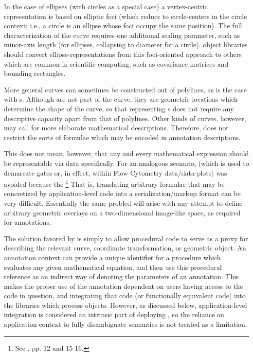 {\begin{description}
In the case of ellipses (with circles as a special case) 
a vertex-centric representation is based on elliptic 
foci (which reduce to circle-centers in the circle 
context; i.e., a circle is an ellipse whose foci occupy 
the same position).  The full characterization of 
the curve requires one additional scaling parameter, 
such as minor-axis length (for ellipses, collapsing 
to diameter for a circle).  \lAXFI{} object libraries  
should convert ellipse-representations from 
this foci-oriented approach to others which are 
common in scientific computing, such as covariance matrices 
and bounding rectangles.  

More general curves can sometimes be constructed out 
of polylines, as is the case with 
\BSPLINE{}s.  Although \BSPLINE{}  
are not part of the curve, they are geometric 
locations which determine the shape of the curve, 
so that representing \BSPLINE{}s does not require 
any descriptive capacity apart from that of 
polylines.  Other kinds of curves, however, 
may call for more elaborate mathematical 
descriptions.  Therefore, \AXFI{} does not 
restrict the sorts of formulae which may be 
encoded in annotation descriptions.

This does not mean, however, that any and every 
mathematical expression should be representable 
via \AXFI{} data specifically.  For an analogous 
scenario, \GatingML{} (which is used to 
demarcate gates or, in effect,  within 
Flow Cytometry data/data-plots)  
was avoided because the \footnote{See , pp. 12 
and 15-16.}  That is, translating arbitrary 
formulae that may be concretized by application-level 
code into a serialization/markup format can be very 
difficult.  Essentially the same probled will arise 
with any attempt to define arbitrary geometric 
overlays on a two-dimensional image-like space, 
as required for \AXFI{} annotations. 

The solution favored by \AXFI{} is simply to allow 
procedural code to serve as a proxy for describing 
the relevant curve, coordinate transformation, or 
geometric object.  An \AXFI{} annotation context 
can provide a unique identifier for a procedure 
which evaluates any given mathematical equation, 
and then use this procedural reference as 
an indirect way of denoting the parameters of 
an annotation.  This makes the proper use 
of the annotation dependent on users having 
access to the code in question, and integrating 
that code (or functionally equivalent code) 
into the libraries which process \AXFI{} 
objects.  However, as discussed below, 
application-level integration is considered 
an intrinsic part of deploying \AXFI{}, so 
the reliance on application context to 
fully disambiguate \AXFI{} semantics is 
not treated as a limitation.


\end{description}}
